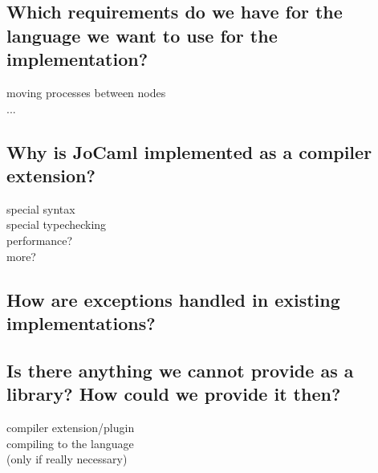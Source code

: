 \documentclass[12pt]{article}
\newcommand{\question}[2]{\subsection{#1}#2}
\begin{document}
  \question{Which requirements do we have for the language we want to use for the implementation?}{
    moving processes between nodes\\
    ...
  }

  \question{Why is JoCaml implemented as a compiler extension?}{
    special syntax\\
    special typechecking\\
    performance?\\
    more?
  }

  \question{How are exceptions handled in existing implementations?}{}

  \question{Is there anything we cannot provide as a library? How could we provide it then?}{
    compiler extension/plugin\\
    compiling to the language\\
    (only if really necessary)
}
\end{document}
